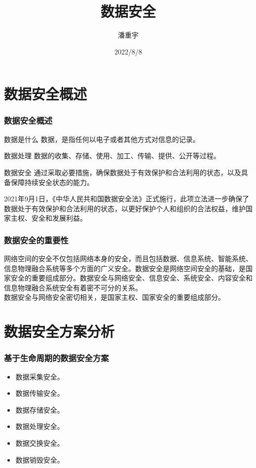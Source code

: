 \documentclass{beamer}
\title{数据安全}
\author{潘重宇}
\date{2022/8/8}
\begin{document}
	
	\frame{\titlepage}
	
	
	\section{数据安全概述}
	\begin{frame}
		\frametitle{数据安全概述}
		\begin{block}{数据是什么}
			数据，是指任何以电子或者其他方式对信息的记录。
		\end{block}
	\begin{block}{数据处理}
		数据的收集、存储、使用、加工、传输、提供、公开等过程。
	\end{block}
	\begin{block}{数据安全}
		通过采取必要措施，确保数据处于有效保护和合法利用的状态，以及具备保障持续安全状态的能力。
	\end{block}
	\quad2021年9月1日，《中华人民共和国数据安全法》正式施行，此项立法进一步确保了数据处于有效保护和合法利用的状态，以更好保护个人和组织的合法权益，维护国家主权、安全和发展利益。
	\end{frame}
	
	\begin{frame}
		\frametitle{数据安全的重要性}
		\quad
		网络空间的安全不仅包括网络本身的安全，而且包括数据、信息系统、智能系统、信息物理融合系统等多个方面的广义安全。数据安全是网络空间安全的基础，是国家安全的重要组成部分。数据安全与网络安全、信息安全、系统安全、内容安全和信息物理融合系统安全有着密不可分的关系。
		\\
		\quad
		数据安全与网络安全密切相关，是国家主权、国家安全的重要组成部分。
	\end{frame}
	
	\section{数据安全方案分析}
	\begin{frame}
		\frametitle{基于生命周期的数据安全方案}
		\begin{itemize}
			\item<1-> 数据采集安全。
			\item<2-> 数据传输安全。
			\item<3-> 数据存储安全。
			\item<4-> 数据处理安全。
			\item<5-> 数据交换安全。
			\item<6-> 数据销毁安全。
		\end{itemize}
	\end{frame}
	
\end{document}
